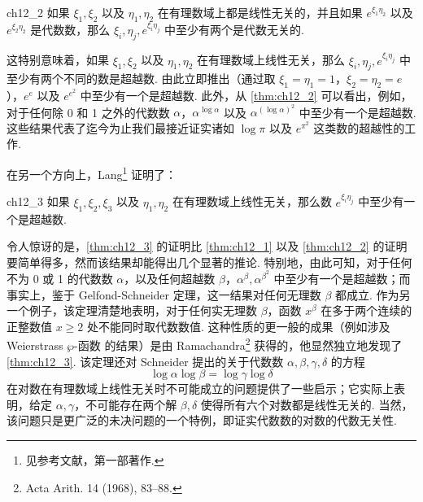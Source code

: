 \begin{mythm}{}{ch12_2}
如果 $\xi_1, \xi_2$ 以及 $\eta_1, \eta_2$ 在有理数域上都是线性无关的，并且如果 $e^{\xi_1\eta_2}$ 以及 $e^{\xi_2\eta_2}$ 是代数数，那么 $\xi_i, \eta_j, e^{\xi_i\eta_j}$ 中至少有两个是代数无关的.
\end{mythm}

这特别意味着，如果 $\xi_1, \xi_2$ 以及 $\eta_1, \eta_2$ 在有理数域上线性无关，那么 $\xi_i, \eta_j, e^{\xi_i\eta_j}$ 中至少有两个不同的数是超越数. 由此立即推出（通过取 $\xi_1 = \eta_1 = 1$，$\xi_2 = \eta_2 = e$），$e^e$ 以及 $e^{e^2}$ 中至少有一个是超越数. 此外，从 \autoref{thm:ch12_2} 可以看出，例如，对于任何除 0 和 1 之外的代数数 $\alpha$，$\alpha^{\log \alpha}$ 以及 $\alpha^{(\log \alpha)^2}$ 中至少有一个是超越数. 这些结果代表了迄今为止我们最接近证实诸如 $\log \pi$ 以及 $e^{\pi^2}$ 这类数的超越性的工作.

在另一个方向上，Lang\footnote{见参考文献，第一部著作.} 证明了：

\begin{mythm}{}{ch12_3}
如果 $\xi_1, \xi_2, \xi_3$ 以及 $\eta_1, \eta_2$ 在有理数域上线性无关，那么数 $e^{\xi_i\eta_j}$ 中至少有一个是超越数.
\end{mythm}

令人惊讶的是，\autoref{thm:ch12_3} 的证明比 \autoref{thm:ch12_1} 以及 \autoref{thm:ch12_2} 的证明要简单得多，然而该结果却能得出几个显著的推论. 特别地，由此可知，对于任何不为 0 或 1 的代数数 $\alpha$，以及任何超越数 $\beta$，$\alpha^{\beta}, \alpha^{\beta^2}$ 中至少有一个是超越数；而事实上，鉴于 Gelfond-Schneider 定理，这一结果对任何无理数 $\beta$ 都成立. 作为另一个例子，该定理清楚地表明，对于任何实无理数 $\beta$，函数 $x^{\beta}$ 在多于两个连续的正整数值 $x \ge 2$ 处不能同时取代数数值. 这种性质的更一般的成果（例如涉及 Weierstrass $\wp$-函数 的结果）是由 Ramachandra\footnote{Acta Arith. 14 (1968), 83--88.} 获得的，他显然独立地发现了 \autoref{thm:ch12_3}. 该定理还对 Schneider 提出的关于代数数 $\alpha, \beta, \gamma, \delta$ 的方程
\[\log \alpha \log \beta = \log \gamma \log \delta\]
在对数在有理数域上线性无关时不可能成立的问题提供了一些启示；它实际上表明，给定 $\alpha, \gamma$，不可能存在两个解 $\beta, \delta$ 使得所有六个对数都是线性无关的. 当然，该问题只是更广泛的未决问题的一个特例，即证实代数数的对数的代数无关性.

